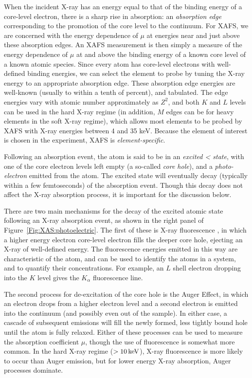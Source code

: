 When the incident X-ray has an energy equal to that of the binding energy
of a core-level electron, there is a sharp rise in absorption: an
\emph{absorption edge} corresponding to the promotion of the core level to
the continuum. For XAFS, we are concerned with the energy dependence of
$\mu$ at energies near and just above these absorption edges.  An XAFS
measurement is then simply a measure of the energy dependence of $\mu $ at
and above the binding energy of a known core level of a known atomic
species.  Since every atom has core-level electrons with well-defined
binding energies, we can select the element to probe by tuning the X-ray
energy to an appropriate absorption edge.  These absorption edge energies
are well-known (usually to within a tenth of percent), and tabulated.  The
edge energies vary with atomic number approximately as $Z^2$, and both $K$
and $L$ levels can be used in the hard X-ray regime (in addition, $M$ edges
can be for heavy elements in the soft X-ray regime), which allows most
elements to be probed by XAFS with X-ray energies between 4 and 35 keV.
Because the element of interest is
chosen in the experiment, XAFS is \emph{element-specific}.

Following an absorption event, the atom is said to be in an \emph{excited
<  state}, with one of the core electron levels left empty (a so-called
\emph{core hole}), and a \emph{photo-electron} emitted from the atom.  The
excited state will eventually decay (typically within a few femtoseconds)
of the absorption event. Though this decay does not affect the X-ray
absorption process, it is important for the discussion below.

There are two main mechanisms for the decay of the excited atomic state
following an X-ray absorption event, as shown in the right panel of
Figure~\ref{Fig:XAS:photoelectric}.  The first of these is X-ray
fluorescence , in which a higher energy electron core-level electron fills
the deeper core hole, ejecting an X-ray of well-defined energy.  The
fluorescence energies emitted in this way are characteristic of the atom,
and can be used to identify the atoms in a system, and to quantify their
concentrations. For example, an $L$ shell electron dropping into the $K$
level gives the $K_{\alpha }$ fluorescence line.

The second process for de-excitation of the core hole is the Auger Effect,
in which an electron drops from a higher electron level and a second
electron is emitted into the continuum (and possibly even out of the
sample).  In either case, a cascade of subsequent emissions will fill the
newly formed, less tightly bound hole until the atom is fully relaxed.
Either of these processes can be used to measure the absorption coefficient
$\mu$, though the use of fluorescence is somewhat more common.  In the hard
X-ray regime ($> 10\rm\,keV$), X-ray fluorescence is more likely to occur
than Auger emission, but for lower energy X-ray absorption, Auger processes
dominate.

